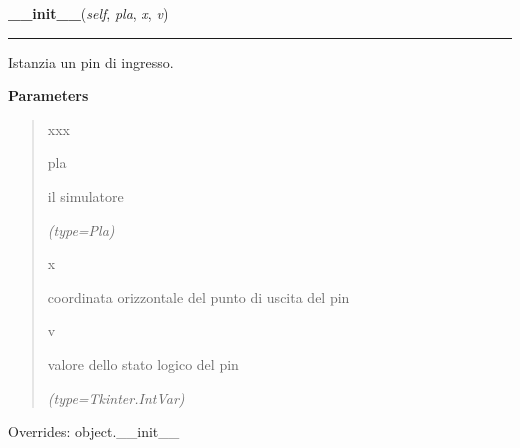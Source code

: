 \hspace{.8\funcindent}\begin{boxedminipage}{\funcwidth}

    \raggedright \textbf{\_\_init\_\_}(\textit{self}, \textit{pla}, \textit{x}, \textit{v})

    \vspace{-1.5ex}

    \rule{\textwidth}{0.5\fboxrule}
\setlength{\parskip}{2ex}
    Istanzia un pin di ingresso.

\setlength{\parskip}{1ex}
      \textbf{Parameters}
      \vspace{-1ex}

      \begin{quote}
        \begin{Ventry}{xxx}

          \item[pla]

          il simulatore

            {\it (type=Pla)}

          \item[x]

          coordinata orizzontale del punto di uscita del pin

          \item[v]

          valore dello stato logico del pin

            {\it (type=Tkinter.IntVar)}

        \end{Ventry}

      \end{quote}

      Overrides: object.\_\_init\_\_

    \end{boxedminipage}

    \label{component:InPin:set_label}

    \vspace{0.5ex}

